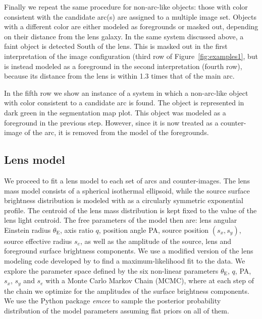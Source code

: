 \documentclass[a4paper,fleqn,usenatbib]{mnras}
\def\Fref#1{Figure~\ref{#1}\xspace}
\def\thetae{\theta_{\mathrm{E}}}
\begin{document}
Finally we repeat the same procedure for non-arc-like objects: those with color consistent with the candidate arc(s) are assigned to a multiple image set. Objects with a different color are either modeled as foregrounds or masked out, depending on their distance from the lens galaxy.
In the same system discussed above, a faint object is detected South of the lens. This is masked out in the first interpretation of the image configuration (third row of \Fref{fig:examples1}, but is instead modeled as a foreground in the second interpretation (fourth row), because its distance from the lens is within 1.3 times that of the main arc.

In the fifth row we show an instance of a system in which a non-arc-like object with color consistent to a candidate arc is found. The object is represented in dark green in the segmentation map plot.
This object was modeled as a foreground in the previous step. However, since it is now treated as a counter-image of the arc, it is removed from the model of the foregrounds.

\subsection{Lens model}\label{ssec:lens}

We proceed to fit a lens model to each set of arcs and counter-images.
The lens mass model consists of a spherical isothermal ellipsoid, while the source surface brightness distribution is modeled with as a circularly symmetric exponential profile.
The centroid of the lens mass distribution is kept fixed to the value of the lens light centroid.
The free parameters of the model then are: lens angular Einstein radius $\thetae$, axis ratio $q$, position angle PA, source position $(s_x, s_y)$, source effective radius $s_e$, as well as the amplitude of the source, lens and foreground surface brightness components. 
We use a modified version of the lens modeling code developed by \citet{Aug++11} to find a maximum-likelihood fit to the data.
We explore the parameter space defined by the six non-linear parameters $\thetae$, $q$, PA, $s_x$, $s_y$ and $s_e$ with a Monte Carlo Markov Chain (MCMC), where at each step of the chain we optimize for the amplitudes of the surface brightness components.
We use the Python package {\em emcee} to sample the posterior probability distribution of the model parameters assuming flat priors on all of them.
\end{document}
